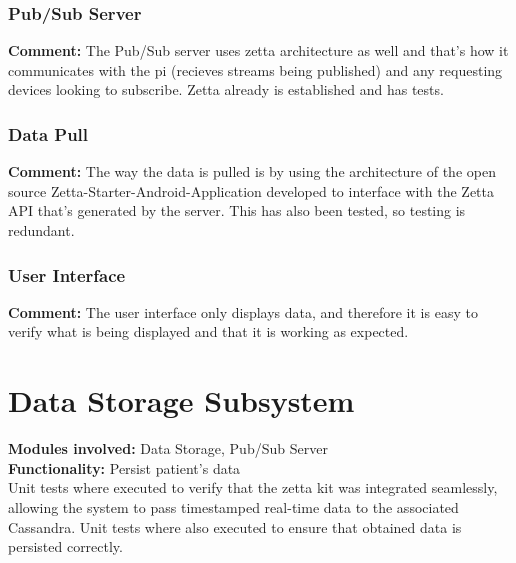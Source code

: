 \documentclass[12pt]{article}
\begin{document}
{	\subsubsection{Pub/Sub Server}
	\textbf{Comment:} The Pub/Sub server uses zetta architecture as well and that's how it communicates with the pi (recieves streams being published) and any requesting devices looking to subscribe. Zetta already is established and has tests.

	\subsubsection{Data Pull}
	\textbf{Comment:} The way the data is pulled is by using the architecture of the open source Zetta-Starter-Android-Application developed to interface with the Zetta API that's generated by the server. This has also been tested, so testing is redundant.
	\subsubsection{User Interface}
	\textbf{Comment:} The user interface only displays data, and therefore it is easy to verify what is being displayed and that it is working as expected.
	
	
	
	
	
	\pagebreak

	\section{Data Storage Subsystem}
	\textbf{Modules involved: } Data Storage, Pub/Sub Server \\
	\textbf{Functionality:} Persist patient's data\\
	Unit tests where executed to verify that the zetta kit was integrated seamlessly, allowing the system to pass timestamped real-time data to the associated Cassandra. Unit tests where also executed to ensure that obtained data is persisted correctly.

}
\end{document}

